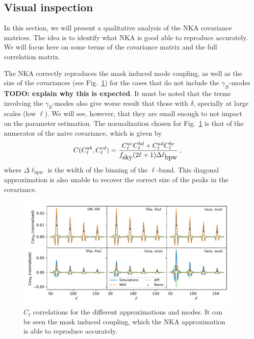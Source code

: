 \documentclass[a4paper,11pt]{article}
\newcommand{\todo}[1]{{\bf TODO: #1}}
\newcommand{\fsky}{f_{\mbox{\rm sky}}}
\newcommand{\cl}{C_\ell}
\newcommand{\lbpw}{\ell_{\mbox{bpw}}}
\newcommand{\fsky}{f_{\mbox{sky}}}
\begin{document}
\subsection{Visual inspection}

In this section, we will present a qualitative analysis of the NKA covariance
matrices. The idea is to identify what NKA is good able to reproduce
accurately. We will focus here on some terms of the covariance matrix and the
full correlation matrix.

The NKA correctly reproduces the mask induced mode coupling, as well as the
size of the covariances (see Fig.~\ref{fig:rows_1bin}) for the cases
that do not include the $\gamma_B$-modes \todo{explain why this is expected}.
It must be noted that the terms involving the $\gamma_E$-modes also give worse
result that those with $\delta$, specially at large scales (low $\ell$). We
will see, however, that they are small enough to not impact on the parameter
estimation. The normalization chosen for Fig.~\ref{fig:rows_1bin} is that of
the numerator of the naive covariance, which is given by
\begin{equation}
  C(\cl^{ab}, \cl^{cd}) = \frac{\cl^{ac}\cl^{bd} + \cl^{ad}\cl^{bc}}{\fsky (2\ell + 1) \Delta\lbpw}\,,
  \label{eq:naive}
\end{equation}
where $\Delta \lbpw$ is the width of the binning of the $\ell$-band. This
diagonal approximation is also unable to recover the correct size of the
peaks in the covariance.

\begin{figure}[htb]
  \centering
  \includegraphics[width=\textwidth]{./figures/all_rows_sph_1bin.pdf}
  \caption{$\cl$ correlations for the different approximations and modes. It
    can be seen the mask induced coupling, which the NKA approximation is able
    to reproduce accurately.}
  \label{fig:rows_1bin}
\end{figure}
\end{document}
